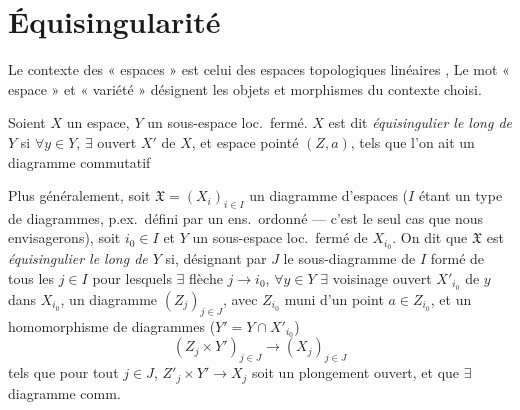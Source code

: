 \documentclass[11pt,a4paper]{article}
\begin{document}
\section*{Équisingularité}

\struck{\ill{}} Le contexte des « espaces » est celui des espaces
topologiques  linéaires , \struck{\ill{}}  Le mot
« espace » et « variété » désignent les \struck{\ill{}} objets et
morphismes du contexte choisi.

Soient $X$ un espace, $Y$ un sous-espace loc.\ fermé. $X$ est dit
\emph{équisingulier le long de $Y$} si $\forall y \in Y$, $\exists$ ouvert
$X'$ de $X$, et espace pointé $(Z, a)$, tels que l'on ait un diagramme
commutatif



Plus généralement, soit $\mathfrak{X} = (X_i)_{i \in I}$ un diagramme
d'espaces ($I$ étant un type de diagrammes, p.ex.\ défini par un ens.\
ordonné --- c'est le seul cas que nous envisagerons), soit $i_0 \in I$ et
$Y$ un sous-espace loc.\ fermé de $X_{i_0}$. On dit que $\mathfrak{X}$ est
\emph{équisingulier le long de $Y$} si, désignant par $J$ le sous-diagramme
de $I$ formé de tous les $j \in I$ pour lesquels \add{ou bien $j = i_0$ ou
bien} $\exists$ flèche $j \to i_0$, $\forall y \in Y$ $\exists$ voisinage
ouvert $X'_{i_0}$ de $y$ dans $X_{i_0}$, \add{d'espaces} un diagramme
$(Z_j)_{j \in J}$, avec $Z_{i_0}$ muni d'un point $a \in Z_{i_0}$, et un
homomorphisme de diagrammes ($Y' = Y \cap X'_{i_0}$)
\[
  (Z_j \times Y')_{j \in J} \longrightarrow (X_j)_{j \in J}
\]
tels que pour tout $j \in J$, $Z'_j \times Y' \to X_j$ soit un plongement
ouvert, et que $\exists$ diagramme comm.

\end{document}
